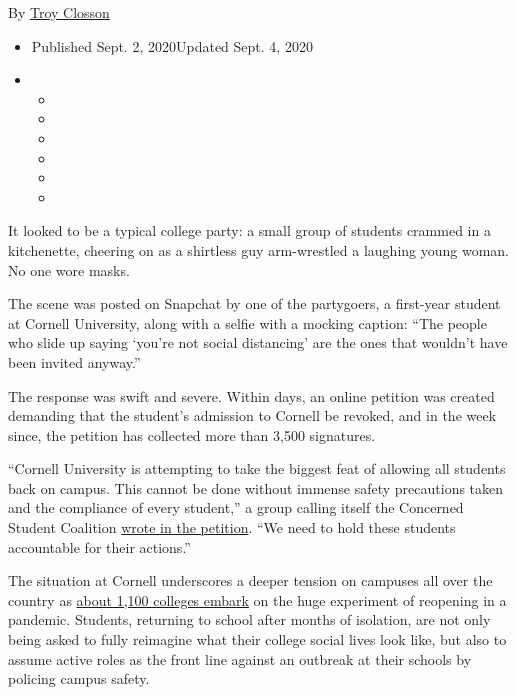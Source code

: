 By \href{https://www.nytimes3xbfgragh.onion/by/troy-closson}{Troy
Closson}

\begin{itemize}
\item
  Published Sept. 2, 2020Updated Sept. 4, 2020
\item
  \begin{itemize}
  \item
  \item
  \item
  \item
  \item
  \item
  \end{itemize}
\end{itemize}

It looked to be a typical college party: a small group of students
crammed in a kitchenette, cheering on as a shirtless guy arm-wrestled a
laughing young woman. No one wore masks.

The scene was posted on Snapchat by one of the partygoers, a first-year
student at Cornell University, along with a selfie with a mocking
caption: ``The people who slide up saying `you're not social distancing'
are the ones that wouldn't have been invited anyway.''

The response was swift and severe. Within days, an online petition was
created demanding that the student's admission to Cornell be revoked,
and in the week since, the petition has collected more than 3,500
signatures.

``Cornell University is attempting to take the biggest feat of allowing
all students back on campus. This cannot be done without immense safety
precautions taken and the compliance of every student,'' a group calling
itself the Concerned Student Coalition
\href{https://www.change.org/p/cornell-university-de-densify-cornell-s-ithaca-campus-by-rescinding-jessica-zhang-24-acceptance}{wrote
in the petition}. ``We need to hold these students accountable for their
actions.''

The situation at Cornell underscores a deeper tension on campuses all
over the country as
\href{https://www.chronicle.com/article/heres-a-list-of-colleges-plans-for-reopening-in-the-fall/?cid2=gen_login_refresh\&cid=gen_sign_in}{about
1,100 colleges embark} on the huge experiment of reopening in a
pandemic. Students, returning to school after months of isolation, are
not only being asked to fully reimagine what their college social lives
look like, but also to assume active roles as the front line against an
outbreak at their schools by policing campus safety.

